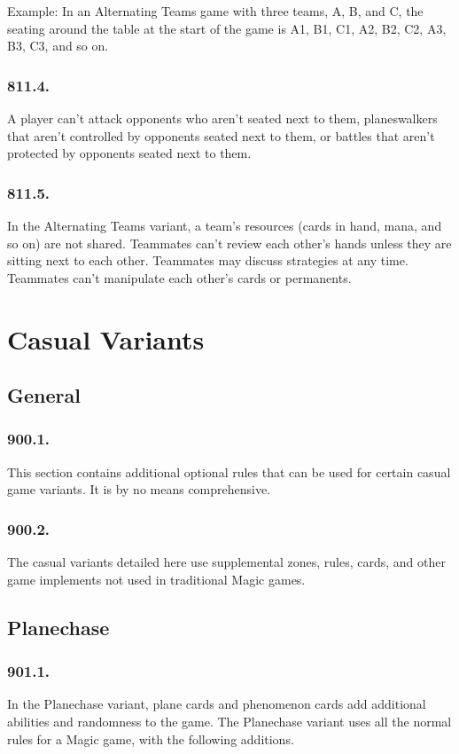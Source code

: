 Example: In an Alternating Teams game with three teams, A, B, and C, the seating around the table at the start of the game is A1, B1, C1, A2, B2, C2, A3, B3, C3, and so on.

\subsection*{811.4.}
A player can’t attack opponents who aren’t seated next to them, planeswalkers that aren’t controlled by opponents seated next to them, or battles that aren’t protected by opponents seated next to them.

\subsection*{811.5.}
In the Alternating Teams variant, a team’s resources (cards in hand, mana, and so on) are not shared. Teammates can’t review each other’s hands unless they are sitting next to each other. Teammates may discuss strategies at any time. Teammates can’t manipulate each other’s cards or permanents.

\chapter{Casual Variants}
\setcounter{section}{899}
\section{General}
\subsection*{900.1.}
This section contains additional optional rules that can be used for certain casual game variants. It is by no means comprehensive.

\subsection*{900.2.}
The casual variants detailed here use supplemental zones, rules, cards, and other game implements not used in traditional Magic games.

\section{Planechase}
\subsection*{901.1.}
In the Planechase variant, plane cards and phenomenon cards add additional abilities and randomness to the game. The Planechase variant uses all the normal rules for a Magic game, with the following additions.

